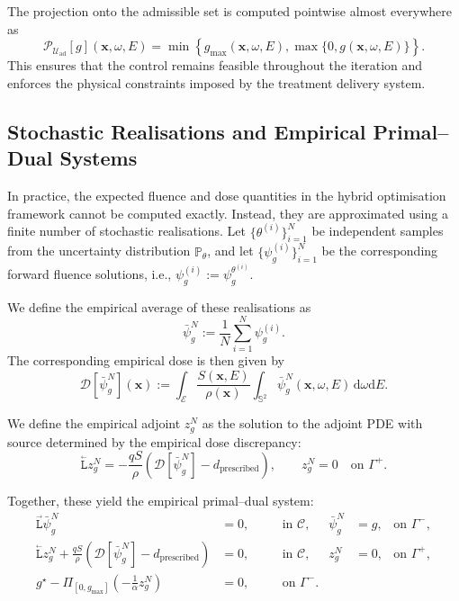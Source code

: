 \documentclass{amsart}
\newcommand{\dd}{{\mathrm d}}
\newcommand{\fL}{\stackrel{_\rightarrow}{\mathtt L}}
\newcommand{\bL}{\stackrel{_\leftarrow}{\mathtt L}}
\theoremstyle{plain}
\newtheorem{remark}[theorem]{Remark}
\renewcommand{\vec}[1]{\ensuremath{\boldsymbol{#1}}}
\begin{document}
  \label{rem:projection}
  The projection onto the admissible set is computed pointwise almost everywhere as
  \begin{equation}
    \mathcal{P}_{\mathcal{U}_{\mathrm{ad}}}[g](\vec{x}, \omega, E)
    = \min\left\{ g_{\max}(\vec{x}, \omega, E), \max\{ 0, g(\vec{x}, \omega, E) \} \right\}.
  \end{equation}
  This ensures that the control remains feasible throughout the
  iteration and enforces the physical constraints imposed by the
  treatment delivery system.

\subsection{Stochastic Realisations and Empirical Primal–Dual Systems}

In practice, the expected fluence and dose quantities in the hybrid
optimisation framework cannot be computed exactly. Instead, they are
approximated using a finite number of stochastic realisations. Let $\{
\theta^{(i)} \}_{i=1}^N$ be independent samples from the uncertainty
distribution $\mathbb{P}_\theta$, and let $\{ \psi_g^{(i)} \}_{i=1}^N$
be the corresponding forward fluence solutions, i.e., $\psi_g^{(i)} :=
\psi_g^{\theta^{(i)}}$.

We define the empirical average of these realisations as
\begin{equation}
  \bar{\psi}_g^N := \frac{1}{N} \sum_{i=1}^N \psi_g^{(i)}.
\end{equation}
The corresponding empirical dose is then given by
\begin{equation}
  \mathcal{D}[\bar{\psi}_g^N](\vec{x}) 
  := \int_{\mathcal{E}} \frac{S(\vec{x}, E)}{\rho(\vec{x})}
  \int_{\mathbb{S}^2} \bar{\psi}_g^N(\vec{x}, \omega, E) \, \dd \omega \dd E.
\end{equation}

We define the empirical adjoint $z_g^N$ as the solution to the adjoint
PDE with source determined by the empirical dose discrepancy:
\begin{equation}
  \bL z_g^N = -\frac{q S}{\rho} \left( \mathcal{D}[\bar{\psi}_g^N] - d_{\text{prescribed}} \right),
  \qquad z_g^N = 0 \quad \text{on } \Gamma^+.
\end{equation}

Together, these yield the empirical primal–dual system:
\begin{align}
  \fL \bar{\psi}_g^N &= 0, &\quad & \text{in } \mathcal{C}, 
  & \bar{\psi}_g^N &= g, & \text{on } \Gamma^-,
  \nonumber \\
  \bL z_g^N + \frac{q S}{\rho} \left( \mathcal{D}[\bar{\psi}_g^N] - d_{\text{prescribed}} \right) &= 0, &\quad & \text{in } \mathcal{C}, 
  & z_g^N &= 0, & \text{on } \Gamma^+,
  \\
  g^\star - \Pi_{[0, g_{\max}]} \left( -\frac{1}{\alpha} z_g^N \right)&= 0, &\quad & \text{on } \Gamma^-.& & & 
  \nonumber
\end{align}
\end{document}
